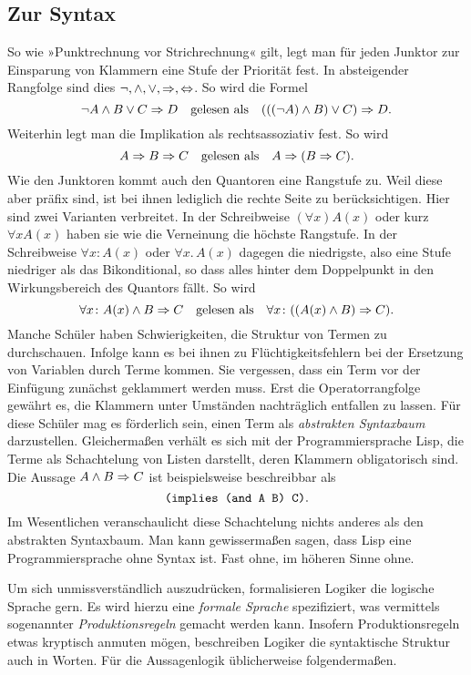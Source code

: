 \subsection{Zur Syntax}

So wie »Punktrechnung vor Strichrechnung« gilt, legt man für jeden
Junktor zur Einsparung von Klammern eine Stufe der Priorität fest. In
absteigender Rangfolge sind dies ${\lnot}, {\land}, {\lor}, {\Rightarrow},
{\Leftrightarrow}$. So wird die Formel
\[\lnot A\land B\lor C\Rightarrow D\quad\text{gelesen als}\quad
(((\lnot A)\land B)\lor C)\Rightarrow D.\]
Weiterhin legt man die Implikation als rechtsassoziativ%
 fest. So wird
\[A\Rightarrow B\Rightarrow C\quad\text{gelesen als}\quad A\Rightarrow (B\Rightarrow C).\]
Wie den Junktoren kommt auch den Quantoren eine Rangstufe zu. Weil
diese aber präfix sind, ist bei ihnen lediglich die rechte Seite zu
berücksichtigen. Hier sind zwei Varianten verbreitet. In der
Schreibweise $(\forall x)A(x)$ oder kurz $\forall xA(x)$ haben
sie wie die Verneinung die höchste Rangstufe. In der Schreibweise
$\forall x\colon A(x)$ oder $\forall x.\, A(x)$ dagegen die niedrigste,
also eine Stufe niedriger als das Bikonditional, so dass alles
hinter dem Doppelpunkt in den Wirkungsbereich des Quantors fällt.
So wird
\[\forall x\colon A(x)\land B\Rightarrow C\quad\text{gelesen als}\quad
\forall x\colon ((A(x)\land B)\Rightarrow C).\]
Manche Schüler haben Schwierigkeiten, die Struktur von Termen zu
durchschauen. Infolge kann es bei ihnen zu Flüchtigkeitsfehlern
bei der Ersetzung von Variablen durch Terme kommen. Sie vergessen,
dass ein Term vor der Einfügung zunächst geklammert werden muss.
Erst die Operatorrangfolge gewährt es, die Klammern unter Umständen
nachträglich entfallen zu lassen. Für diese Schüler mag es förderlich
sein, einen Term als \emph{abstrakten Syntaxbaum} darzustellen.
Gleichermaßen verhält es sich mit der Programmiersprache Lisp, die
Terme als Schachtelung von Listen darstellt, deren Klammern
obligatorisch sind.  Die Aussage $A\land B\Rightarrow C$ ist beispielsweise
beschreibbar als
\[\text{\texttt{(implies (and A B) C)}}.\]
Im Wesentlichen veranschaulicht diese Schachtelung
nichts anderes als den abstrakten Syntaxbaum. Man kann gewissermaßen
sagen, dass Lisp eine Programmiersprache ohne Syntax ist. Fast ohne,
im höheren Sinne ohne.

Um sich unmissverständlich auszudrücken, formalisieren Logiker die
logische Sprache gern. Es wird hierzu eine \emph{formale Sprache} spezifiziert,
was vermittels sogenannter \emph{Produktionsregeln} gemacht werden kann.
Insofern Produktionsregeln etwas kryptisch anmuten mögen, beschreiben
Logiker die syntaktische Struktur auch in Worten.
Für die Aussagenlogik üblicherweise folgendermaßen.

